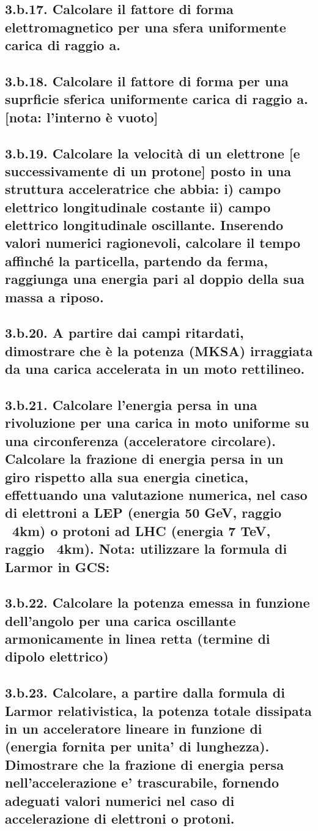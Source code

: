 \subsection*{3.b.17. Calcolare il fattore di forma elettromagnetico per una sfera uniformente carica di raggio a.}

\subsection*{3.b.18. Calcolare il fattore di forma per una suprficie sferica uniformente carica di raggio a. [nota: l'interno è vuoto]}

\subsection*{3.b.19. Calcolare la velocità di un elettrone [e successivamente di un protone] posto in una struttura acceleratrice che abbia: i) campo elettrico longitudinale costante ii) campo elettrico longitudinale oscillante. Inserendo valori numerici ragionevoli, calcolare il tempo affinché la particella, partendo da ferma, raggiunga una energia pari al doppio della sua massa a riposo.}

\subsection*{3.b.20. A partire dai campi ritardati, dimostrare che è la potenza (MKSA) irraggiata da una carica accelerata in un moto rettilineo.}

\subsection*{3.b.21. Calcolare l’energia persa in una rivoluzione per una carica in moto uniforme su una circonferenza (acceleratore circolare). Calcolare la frazione di energia persa
in un giro rispetto alla sua energia cinetica, effettuando una valutazione numerica, nel caso di elettroni a LEP (energia 50 GeV, raggio ~4km) o protoni ad LHC (energia 7 TeV, raggio ~4km). Nota: utilizzare la formula di Larmor in GCS:}

\subsection*{3.b.22. Calcolare la potenza emessa in funzione dell’angolo per una carica oscillante armonicamente in linea retta (termine di dipolo elettrico)}

\subsection*{3.b.23. Calcolare, a partire dalla formula di Larmor relativistica, la potenza totale dissipata in un acceleratore lineare in funzione di (energia fornita per unita’ di lunghezza). Dimostrare che la frazione di energia persa nell’accelerazione e’ trascurabile, fornendo adeguati valori numerici nel caso di accelerazione di elettroni o protoni.}

